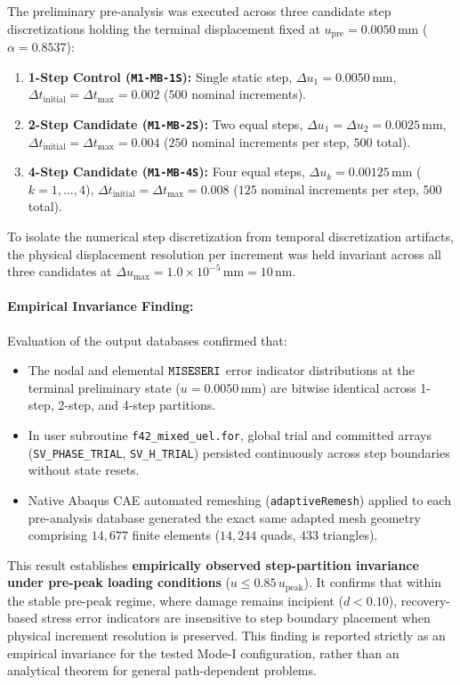 The preliminary pre-analysis was executed across three candidate step discretizations holding the terminal displacement fixed at $u_{\mathrm{pre}} = 0.0050\,\mathrm{mm}$ ($\alpha = 0.8537$):
\begin{enumerate}
  \item \textbf{1-Step Control (\texttt{M1-MB-1S}):} Single static step, $\Delta u_1 = 0.0050\,\mathrm{mm}$, $\Delta t_{\mathrm{initial}} = \Delta t_{\max} = 0.002$ ($500$ nominal increments).
  \item \textbf{2-Step Candidate (\texttt{M1-MB-2S}):} Two equal steps, $\Delta u_1 = \Delta u_2 = 0.0025\,\mathrm{mm}$, $\Delta t_{\mathrm{initial}} = \Delta t_{\max} = 0.004$ ($250$ nominal increments per step, $500$ total).
  \item \textbf{4-Step Candidate (\texttt{M1-MB-4S}):} Four equal steps, $\Delta u_k = 0.00125\,\mathrm{mm}$ ($k=1,\dots,4$), $\Delta t_{\mathrm{initial}} = \Delta t_{\max} = 0.008$ ($125$ nominal increments per step, $500$ total).
\end{enumerate}

To isolate the numerical step discretization from temporal discretization artifacts, the physical displacement resolution per increment was held invariant across all three candidates at $\Delta u_{\max} = 1.0 \times 10^{-5}\,\mathrm{mm} = 10\,\mathrm{nm}$. 

\paragraph{Empirical Invariance Finding:}
Evaluation of the output databases confirmed that:
\begin{itemize}
  \item The nodal and elemental $\texttt{MISESERI}$ error indicator distributions at the terminal preliminary state ($u = 0.0050\,\mathrm{mm}$) are bitwise identical across 1-step, 2-step, and 4-step partitions.
  \item In user subroutine \texttt{f42\_mixed\_uel.for}, global trial and committed arrays (\texttt{SV\_PHASE\_TRIAL}, \texttt{SV\_H\_TRIAL}) persisted continuously across step boundaries without state resets.
  \item Native Abaqus CAE automated remeshing (\texttt{adaptiveRemesh}) applied to each pre-analysis database generated the exact same adapted mesh geometry comprising $14{,}677$ finite elements ($14{,}244$ quads, $433$ triangles).
\end{itemize}
This result establishes \textbf{empirically observed step-partition invariance under pre-peak loading conditions} ($u \le 0.85\,u_{\mathrm{peak}}$). It confirms that within the stable pre-peak regime, where damage remains incipient ($d < 0.10$), recovery-based stress error indicators are insensitive to step boundary placement when physical increment resolution is preserved. This finding is reported strictly as an empirical invariance for the tested Mode-I configuration, rather than an analytical theorem for general path-dependent problems.

